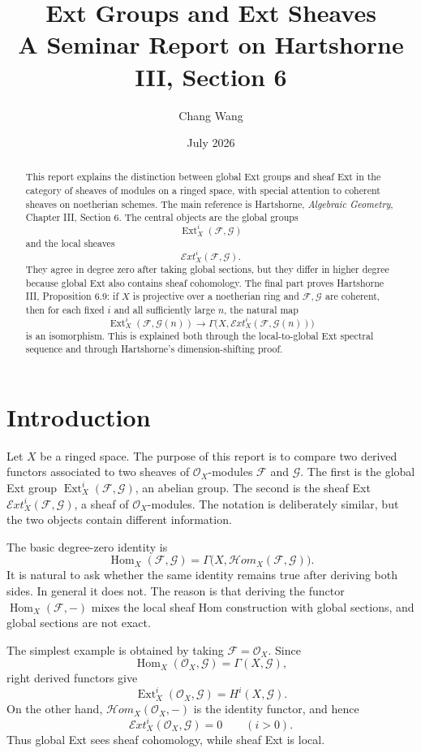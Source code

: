 \documentclass[11pt,a4paper]{article}
\title{Ext Groups and Ext Sheaves\\
\large A Seminar Report on Hartshorne III, Section 6}
\author{Chang Wang}
\date{July 2026}
\numberwithin{equation}{section}
\theoremstyle{plain}
\theoremstyle{definition}
\theoremstyle{remark}
\newcommand{\OO}{\mathcal O}
\newcommand{\F}{\mathcal F}
\newcommand{\G}{\mathcal G}
\DeclareMathOperator{\Ext}{Ext}
\DeclareMathOperator{\Hom}{Hom}
\newcommand{\sExt}{\mathcal{E}\!xt}
\newcommand{\sHom}{\mathcal{H}\!om}
\begin{document}
\maketitle

\begin{abstract}
This report explains the distinction between global Ext groups and sheaf Ext in the category of sheaves of modules on a ringed space, with special attention to coherent sheaves on noetherian schemes.  The main reference is Hartshorne, \emph{Algebraic Geometry}, Chapter III, Section 6.  The central objects are the global groups
\[
  \Ext_X^i(\F,\G)
\]
and the local sheaves
\[
  \sExt_X^i(\F,\G).
\]
They agree in degree zero after taking global sections, but they differ in higher degree because global Ext also contains sheaf cohomology.  The final part proves Hartshorne III, Proposition 6.9: if \(X\) is projective over a noetherian ring and \(\F,\G\) are coherent, then for each fixed \(i\) and all sufficiently large \(n\), the natural map
\[
  \Ext_X^i(\F,\G(n))
  \longrightarrow
  \Gamma\bigl(X,\sExt_X^i(\F,\G(n))\bigr)
\]
is an isomorphism.  This is explained both through the local-to-global Ext spectral sequence and through Hartshorne's dimension-shifting proof.
\end{abstract}

\section{Introduction}

Let \(X\) be a ringed space.  The purpose of this report is to compare two derived functors associated to two sheaves of \(\OO_X\)-modules \(\F\) and \(\G\).  The first is the global Ext group \(\Ext_X^i(\F,\G)\), an abelian group.  The second is the sheaf Ext \(\sExt_X^i(\F,\G)\), a sheaf of \(\OO_X\)-modules.  The notation is deliberately similar, but the two objects contain different information.

The basic degree-zero identity is
\begin{equation}\label{eq:hom-global-sections}
  \Hom_X(\F,\G)
  =
  \Gamma\bigl(X,\sHom_X(\F,\G)\bigr).
\end{equation}
It is natural to ask whether the same identity remains true after deriving both sides.  In general it does not.  The reason is that deriving the functor \(\Hom_X(\F,-)\) mixes the local sheaf Hom construction with global sections, and global sections are not exact.

The simplest example is obtained by taking \(\F=\OO_X\).  Since
\[
  \Hom_X(\OO_X,\G)=\Gamma(X,\G),
\]
right derived functors give
\[
  \Ext_X^i(\OO_X,\G)=H^i(X,\G).
\]
On the other hand, \(\sHom_X(\OO_X,-)\) is the identity functor, and hence
\[
  \sExt_X^i(\OO_X,\G)=0 \qquad (i>0).
\]
Thus global Ext sees sheaf cohomology, while sheaf Ext is local.
\end{document}

